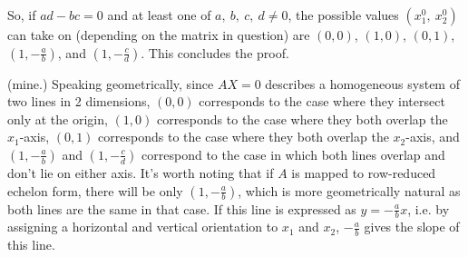 \documentclass[12pt]{article}
\begin{document}
\begin{enumerate}
\begin{enumerate}
          So, if $ad - bc = 0$ and at least one of $a,\ b,\ c,\ d
          \neq 0$, the possible values $(x_{1}^{0},\ x_{2}^{0})$
          can take on (depending on the matrix in question) are
          $(0,0)$, $(1,0)$, $(0,1)$, $(1,-\frac{a}{b})$, and
          $(1,-\frac{c}{d})$. This concludes the proof.

          \begin{comm}
            (mine.) Speaking geometrically, since $AX = 0$
            describes a homogeneous system of two lines in 2
            dimensions, $(0,0)$ corresponds to the case where
            they intersect only at the origin, $(1,0)$
            corresponds to the case where they both overlap the
            $x_1$-axis, $(0,1)$ corresponds to the case where
            they both overlap the $x_2$-axis, and
            $(1,-\frac{a}{b})$ and $(1,-\frac{c}{d})$ correspond
            to the case in which both lines overlap and don't lie
            on either axis. It's worth noting that if $A$ is
            mapped to row-reduced echelon form, there will be
            only $(1,-\frac{a}{b})$, which is more geometrically
            natural as both lines are the same in that case. If
            this line is expressed as $y = -\frac{a}{b}x$, i.e.
            by assigning a horizontal and vertical orientation to
            $x_1$ and $x_2$, $-\frac{a}{b}$ gives the slope of
            this line.
          \end{comm}
    \end{enumerate}

\end{enumerate}
\end{document}
